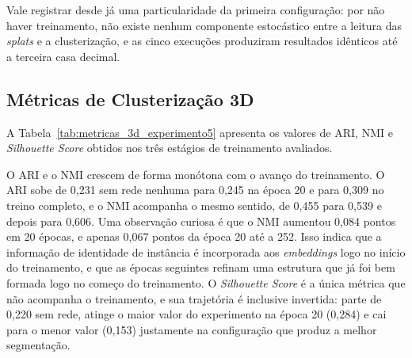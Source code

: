 Vale registrar desde já uma particularidade da primeira configuração: por não haver treinamento, não existe nenhum componente estocástico entre a leitura das \emph{splats} e a clusterização, e as cinco execuções produziram resultados idênticos até a terceira casa decimal.

\subsection{Métricas de Clusterização 3D}

A Tabela~\ref{tab:metricas_3d_experimento5} apresenta os valores de ARI, NMI e \textit{Silhouette Score} obtidos nos três estágios de treinamento avaliados.

\begin{table}[H]
\centering
\caption{Métricas de clusterização 3D em função do estágio de treinamento da GNN (média de 5 execuções)}
\label{tab:metricas_3d_experimento5}
\end{table}

O ARI e o NMI crescem de forma monótona com o avanço do treinamento. O ARI sobe de 0,231 sem rede nenhuma para 0,245 na época 20 e para 0,309 no treino completo, e o NMI acompanha o mesmo sentido, de 0,455 para 0,539 e depois para 0,606. Uma observação curiosa é que o NMI aumentou 0,084 pontos em 20 épocas, e apenas 0,067 pontos da época 20 até a 252. Isso indica que a informação de identidade de instância é incorporada aos \textit{embeddings} logo no início do treinamento, e que as épocas seguintes refinam uma estrutura que já foi bem formada logo no começo do treinamento. O \textit{Silhouette Score} é a única métrica que não acompanha o treinamento, e sua trajetória é inclusive invertida: parte de 0,220 sem rede, atinge o maior valor do experimento na época 20 (0,284) e cai para o menor valor (0,153) justamente na configuração que produz a melhor segmentação. 

